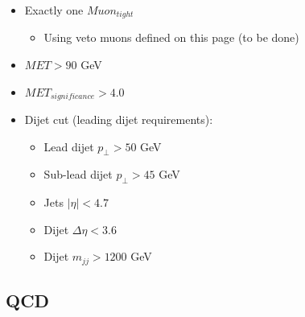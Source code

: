 \begin{itemize}
  \item Exactly one $Muon_{tight}$
  \begin{itemize}
    \item Using veto muons defined on this page (to be done)
  \end{itemize}
  \item $MET > 90 $ GeV
  \item $MET_{significance} > 4.0 $
  \item Dijet cut (leading dijet requirements):
  \begin{itemize}
    \item Lead dijet $ p_{\perp} > 50$ GeV
    \item Sub-lead dijet $ p_{\perp} > 45$ GeV
    \item Jets $ |\eta| < 4.7 $
    \item Dijet $ \Delta\eta < 3.6 $
    \item Dijet $ m_{jj} > 1200 $ GeV
  \end{itemize}
\end{itemize}
    



\subsection{QCD}



